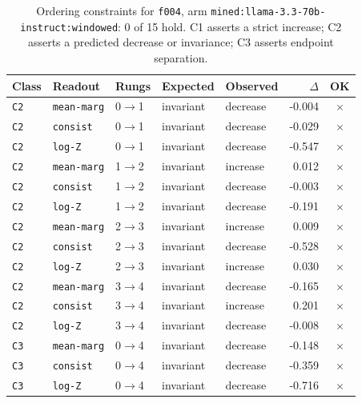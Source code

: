 \documentclass[11pt]{article}
\begin{document}
\begin{table}[htbp]
\centering
\small
\caption{Ordering constraints for \texttt{f004}, arm \texttt{mined:llama-3.3-70b-instruct:windowed}: 0 of 15 hold. C1 asserts a strict increase; C2 asserts a predicted decrease or invariance; C3 asserts endpoint separation.}
\label{tab:ladder-f004-mined-llama-3-3-70b-instruct-windowed}
\begin{tabular}{lllllrc}
\toprule
Class & Readout & Rungs & Expected & Observed & $\Delta$ & OK \\
\midrule
\texttt{C2} & \texttt{mean-marg} & 0$\to$1 & invariant & decrease & -0.004 & $\times$ \\
\texttt{C2} & \texttt{consist} & 0$\to$1 & invariant & decrease & -0.029 & $\times$ \\
\texttt{C2} & \texttt{log-Z} & 0$\to$1 & invariant & decrease & -0.547 & $\times$ \\
\texttt{C2} & \texttt{mean-marg} & 1$\to$2 & invariant & increase & 0.012 & $\times$ \\
\texttt{C2} & \texttt{consist} & 1$\to$2 & invariant & decrease & -0.003 & $\times$ \\
\texttt{C2} & \texttt{log-Z} & 1$\to$2 & invariant & decrease & -0.191 & $\times$ \\
\texttt{C2} & \texttt{mean-marg} & 2$\to$3 & invariant & increase & 0.009 & $\times$ \\
\texttt{C2} & \texttt{consist} & 2$\to$3 & invariant & decrease & -0.528 & $\times$ \\
\texttt{C2} & \texttt{log-Z} & 2$\to$3 & invariant & increase & 0.030 & $\times$ \\
\texttt{C2} & \texttt{mean-marg} & 3$\to$4 & invariant & decrease & -0.165 & $\times$ \\
\texttt{C2} & \texttt{consist} & 3$\to$4 & invariant & increase & 0.201 & $\times$ \\
\texttt{C2} & \texttt{log-Z} & 3$\to$4 & invariant & decrease & -0.008 & $\times$ \\
\texttt{C3} & \texttt{mean-marg} & 0$\to$4 & invariant & decrease & -0.148 & $\times$ \\
\texttt{C3} & \texttt{consist} & 0$\to$4 & invariant & decrease & -0.359 & $\times$ \\
\texttt{C3} & \texttt{log-Z} & 0$\to$4 & invariant & decrease & -0.716 & $\times$ \\
\bottomrule
\end{tabular}
\end{table}
\end{document}
